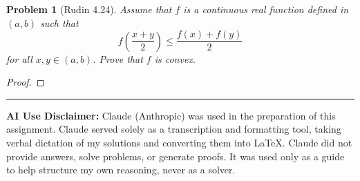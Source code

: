 \documentclass[12 pt]{article}        	%
\newtheorem{prob}{Problem}
\begin{document}
\begin{prob}[Rudin 4.24]
Assume that $f$ is a continuous real function defined in $(a,b)$ such that
\[
f\!\left(\frac{x+y}{2}\right) \leq \frac{f(x) + f(y)}{2}
\]
for all $x, y \in (a,b)$. Prove that $f$ is convex.
\end{prob}
\begin{proof}

\end{proof}

\vspace{2em}
\hrule
\vspace{1em}
\noindent\textbf{AI Use Disclaimer:} Claude (Anthropic) was used in the preparation of this assignment. Claude served solely as a transcription and formatting tool, taking verbal dictation of my solutions and converting them into \LaTeX. Claude did not provide answers, solve problems, or generate proofs. It was used only as a guide to help structure my own reasoning, never as a solver.
\end{document}
